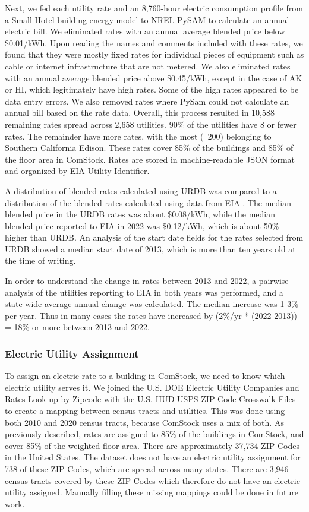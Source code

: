 Next, we fed each utility rate and an 8,760-hour electric consumption profile from a Small Hotel building energy model to NREL PySAM \citep{pysam} to calculate an annual electric bill. We eliminated rates with an annual average blended price below \$0.01/kWh. Upon reading the names and comments included with these rates, we found that they were mostly fixed rates for individual pieces of equipment such as cable or internet infrastructure that are not metered. We also eliminated rates with an annual average blended price above \$0.45/kWh, except in the case of AK or HI, which legitimately have high rates. Some of the high rates appeared to be data entry errors. We also removed rates where PySam could not calculate an annual bill based on the rate data. Overall, this process resulted in 10,588 remaining rates spread across 2,658 utilities. 90\% of the utilities have 8 or fewer rates. The remainder have more rates, with the most (~200) belonging to Southern California Edison. These rates cover 85\% of the buildings and 85\% of the floor area in ComStock. Rates are stored in machine-readable JSON format and organized by EIA Utility Identifier.

A distribution of blended rates calculated using URDB was compared to a distribution of the blended rates calculated using data from EIA \citep{eia_electricity}. The median blended price in the URDB rates was about \$0.08/kWh, while the median blended price reported to EIA in 2022 was \$0.12/kWh, which is about 50\% higher than URDB. An analysis of the start date fields for the rates selected from URDB showed a median start date of 2013, which is more than ten years old at the time of writing.

In order to understand the change in rates between 2013 and 2022, a pairwise analysis of the utilities reporting to EIA \citep{eia_electricity} in both years was performed, and a state-wide average annual change was calculated. The median increase was 1-3\% per year. Thus in many cases the rates have increased by (2\%/yr * (2022-2013)) = 18\% or more between 2013 and 2022.

\subsubsection{Electric Utility Assignment}
To assign an electric rate to a building in ComStock, we need to know which electric utility serves it. We joined the U.S. DOE Electric Utility Companies and Rates Look-up by Zipcode \citep{zip_to_util} with the U.S. HUD USPS ZIP Code Crosswalk Files \citep{tract_to_zip} to create a mapping between census tracts and utilities. This was done using both 2010 and 2020 census tracts, because ComStock uses a mix of both.
As previously described, rates are assigned to 85\% of the buildings in ComStock, and cover 85\% of the weighted floor area. There are approximately 37,734 ZIP Codes in the United States. The dataset does not have an electric utility assignment for 738 of these ZIP Codes, which are spread across many states. There are 3,946 census tracts covered by these ZIP Codes which therefore do not have an electric utility assigned. Manually filling these missing mappings could be done in future work.

